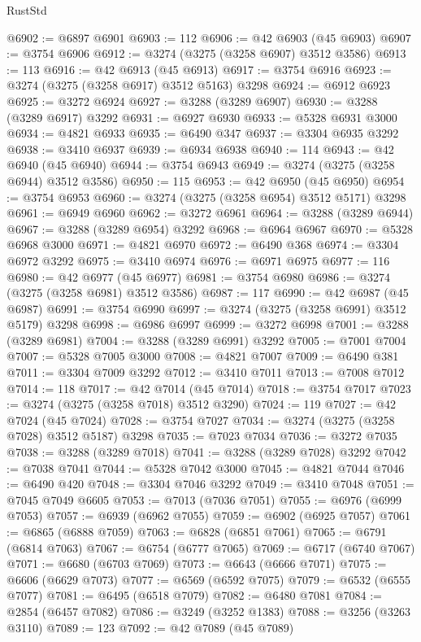 \begin{lexlean}{RustStd}
\begin{coremodule}
@6902 := @6897 @6901
@6903 := 112
@6906 := @42 @6903 (@45 @6903)
@6907 := @3754 @6906
@6912 := @3274 (@3275 (@3258 @6907) @3512 @3586)
@6913 := 113
@6916 := @42 @6913 (@45 @6913)
@6917 := @3754 @6916
@6923 := @3274 (@3275 (@3258 @6917) @3512 @5163) @3298
@6924 := @6912 @6923
@6925 := @3272 @6924
@6927 := @3288 (@3289 @6907)
@6930 := @3288 (@3289 @6917) @3292
@6931 := @6927 @6930
@6933 := @5328 @6931 @3000
@6934 := @4821 @6933
@6935 := @6490 @347
@6937 := @3304 @6935 @3292
@6938 := @3410 @6937
@6939 := @6934 @6938
@6940 := 114
@6943 := @42 @6940 (@45 @6940)
@6944 := @3754 @6943
@6949 := @3274 (@3275 (@3258 @6944) @3512 @3586)
@6950 := 115
@6953 := @42 @6950 (@45 @6950)
@6954 := @3754 @6953
@6960 := @3274 (@3275 (@3258 @6954) @3512 @5171) @3298
@6961 := @6949 @6960
@6962 := @3272 @6961
@6964 := @3288 (@3289 @6944)
@6967 := @3288 (@3289 @6954) @3292
@6968 := @6964 @6967
@6970 := @5328 @6968 @3000
@6971 := @4821 @6970
@6972 := @6490 @368
@6974 := @3304 @6972 @3292
@6975 := @3410 @6974
@6976 := @6971 @6975
@6977 := 116
@6980 := @42 @6977 (@45 @6977)
@6981 := @3754 @6980
@6986 := @3274 (@3275 (@3258 @6981) @3512 @3586)
@6987 := 117
@6990 := @42 @6987 (@45 @6987)
@6991 := @3754 @6990
@6997 := @3274 (@3275 (@3258 @6991) @3512 @5179) @3298
@6998 := @6986 @6997
@6999 := @3272 @6998
@7001 := @3288 (@3289 @6981)
@7004 := @3288 (@3289 @6991) @3292
@7005 := @7001 @7004
@7007 := @5328 @7005 @3000
@7008 := @4821 @7007
@7009 := @6490 @381
@7011 := @3304 @7009 @3292
@7012 := @3410 @7011
@7013 := @7008 @7012
@7014 := 118
@7017 := @42 @7014 (@45 @7014)
@7018 := @3754 @7017
@7023 := @3274 (@3275 (@3258 @7018) @3512 @3290)
@7024 := 119
@7027 := @42 @7024 (@45 @7024)
@7028 := @3754 @7027
@7034 := @3274 (@3275 (@3258 @7028) @3512 @5187) @3298
@7035 := @7023 @7034
@7036 := @3272 @7035
@7038 := @3288 (@3289 @7018)
@7041 := @3288 (@3289 @7028) @3292
@7042 := @7038 @7041
@7044 := @5328 @7042 @3000
@7045 := @4821 @7044
@7046 := @6490 @420
@7048 := @3304 @7046 @3292
@7049 := @3410 @7048
@7051 := @7045 @7049 @6605
@7053 := @7013 (@7036 @7051)
@7055 := @6976 (@6999 @7053)
@7057 := @6939 (@6962 @7055)
@7059 := @6902 (@6925 @7057)
@7061 := @6865 (@6888 @7059)
@7063 := @6828 (@6851 @7061)
@7065 := @6791 (@6814 @7063)
@7067 := @6754 (@6777 @7065)
@7069 := @6717 (@6740 @7067)
@7071 := @6680 (@6703 @7069)
@7073 := @6643 (@6666 @7071)
@7075 := @6606 (@6629 @7073)
@7077 := @6569 (@6592 @7075)
@7079 := @6532 (@6555 @7077)
@7081 := @6495 (@6518 @7079)
@7082 := @6480 @7081
@7084 := @2854 (@6457 @7082)
@7086 := @3249 (@3252 @1383)
@7088 := @3256 (@3263 @3110)
@7089 := 123
@7092 := @42 @7089 (@45 @7089)

\end{coremodule}
\end{lexlean}

